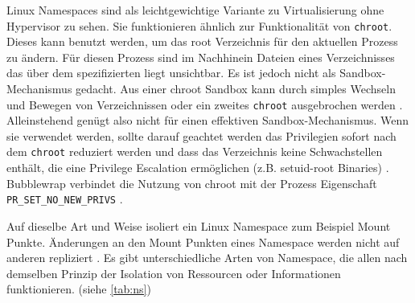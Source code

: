 Linux Namespaces sind als leichtgewichtige Variante zu Virtualisierung ohne Hypervisor zu sehen. Sie funktionieren ähnlich zur Funktionalität von \texttt{chroot}. Dieses kann benutzt werden, um das root Verzeichnis für den aktuellen Prozess zu ändern. Für diesen Prozess sind im Nachhinein Dateien eines Verzeichnisses das über dem spezifizierten liegt unsichtbar. Es ist jedoch nicht als Sandbox-Mechanismus gedacht. Aus einer chroot Sandbox kann
durch simples Wechseln und Bewegen von Verzeichnissen oder ein zweites \texttt{chroot} ausgebrochen werden \cite{man-chroot, second-chroot}. Alleinstehend genügt also nicht für einen effektiven Sandbox-Mechanismus. Wenn sie verwendet werden, sollte darauf geachtet werden das Privilegien sofort nach dem \texttt{chroot} reduziert werden und dass das Verzeichnis keine Schwachstellen enthält, die eine Privilege Escalation ermöglichen (z.B. setuid-root Binaries) \cite{second-chroot}.
Bubblewrap verbindet die Nutzung von chroot mit der Prozess Eigenschaft \texttt{PR\_SET\_NO\_NEW\_PRIVS} \cite{git-bubblewrap}.

Auf dieselbe Art und Weise isoliert ein Linux Namespace zum Beispiel Mount Punkte. Änderungen an den Mount Punkten eines Namespace
werden nicht auf anderen repliziert \cite{man-mount-ns}.
Es gibt unterschiedliche Arten von Namespace, die allen nach demselben Prinzip der Isolation von Ressourcen oder Informationen funktionieren. (siehe \ref{tab:ns})

\begin{table}[]
\label{tab:ns}
\centering
{}
\caption{Aus \cite{man-ns-7}}
\end{table}

